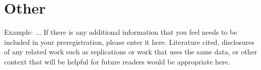 \documentclass[highlight, explanations]{prereg}
\begin{document}
\section{Other}

{Example: ...
}
{If there is any additional information that you feel needs to be included in your preregistration, please enter it here. Literature cited, disclosures of any related work such as replications or work that uses the same data, or other context that will be helpful for future readers would be appropriate here. 
}
\end{document}
